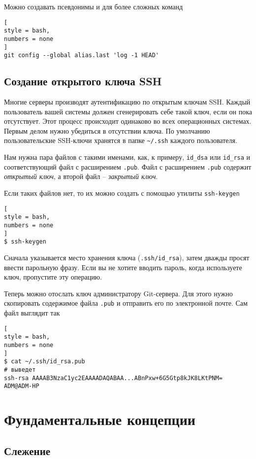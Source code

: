 \documentclass[%
	11pt,
	a4paper,
	utf8,
		]{article}
\begin{document}
Можно создавать псевдонимы и для более сложных команд
\begin{lstlisting}[
style = bash,
numbers = none
]
git config --global alias.last 'log -1 HEAD'
\end{lstlisting}

\subsection{Создание открытого ключа SSH}

Многие серверы производят аутентификацию по открытым ключам SSH. Каждый пользователь вашей системы должен сгенерировать себе такой ключ, если он пока отсутствует. Этот процесс происходит одинаково во всех операционных системах. Первым делом нужно убедиться в отсутствии ключа. По умолчанию пользовательские SSH-ключи хранятся в папке \verb|~/.ssh| каждого пользователя.

Нам нужна пара файлов с такими именами, как, к примеру, \texttt{id\_dsa} или \texttt{id\_rsa} и соответствующий файл с расширением \texttt{.pub}. Файл с расширением \texttt{.pub} содержит \emph{открытый ключ}, а второй файл -- \emph{закрытый ключ}.

Если таких файлов нет, то их можно создать с помощью утилиты \texttt{ssh-keygen}
\begin{lstlisting}[
style = bash,
numbers = none
]
$ ssh-keygen
\end{lstlisting}

Сначала указывается место хранения ключа (\texttt{.ssh/id\_rsa}), затем дважды просят ввести парольную фразу. Если вы не хотите вводить пароль, когда используете ключ, пропустите эту операцию.

Теперь можно отослать ключ администратору Git-сервера. Для этого нужно скопировать содержимое файла \texttt{.pub} и отправить его по электронной почте. Сам файл выглядит так
\begin{lstlisting}[
style = bash,
numbers = none
]
$ cat ~/.ssh/id_rsa.pub
# выведет
ssh-rsa AAAAB3NzaC1yc2EAAAADAQABAA...ABnPxw+6G5Gtp8kJK8LKtPNM= ADM@ADM-HP
\end{lstlisting}


\section{Фундаментальные концепции}

\subsection{Слежение}
\end{document}
